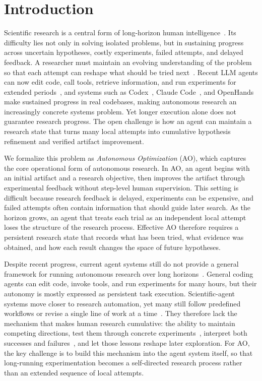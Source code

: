 \documentclass{llmxive}
\begin{document}
\section{Introduction}\label{sec:intro}

Scientific research is a central form of long-horizon human intelligence~\citep{aiscientist_long,aiscientistsurvey}. Its difficulty lies not only in solving isolated problems, but in sustaining progress across uncertain hypotheses, costly experiments, failed attempts, and delayed feedback. A researcher must maintain an evolving understanding of the problem so that each attempt can reshape what should be tried next~\citep{memorysurvey}. Recent LLM agents can now edit code, call tools, retrieve information, and run experiments for extended periods~\citep{react,toolformer,toolllm}, and systems such as Codex~\citep{codex}, Claude Code~\citep{claudecode}, and OpenHands~\citep{openhands} make sustained progress in real codebases, making autonomous research an increasingly concrete systems problem. Yet longer execution alone does not guarantee research progress. The open challenge is how an agent can maintain a research state that turns many local attempts into cumulative hypothesis refinement and verified artifact improvement.

We formalize this problem as \emph{Autonomous Optimization} (AO), which captures the core operational form of autonomous research. In AO, an agent begins with an initial artifact and a research objective, then improves the artifact through experimental feedback without step-level human supervision. This setting is difficult because research feedback is delayed, experiments can be expensive, and failed attempts often contain information that should guide later search. As the horizon grows, an agent that treats each trial as an independent local attempt loses the structure of the research process. Effective AO therefore requires a persistent research state that records what has been tried, what evidence was obtained, and how each result changes the space of future hypotheses.

Despite recent progress, current agent systems still do not provide a general framework for running autonomous research over long horizons~\citep{metaharness,autoharness}. General coding agents can edit code, invoke tools, and run experiments for many hours, but their autonomy is mostly expressed as persistent task execution. Scientific-agent systems move closer to research automation, yet many still follow predefined workflows or revise a single line of work at a time~\citep{aiscientist,agentlaboratory,aflow}. They therefore lack the mechanism that makes human research cumulative: the ability to maintain competing directions, test them through concrete experiments~\citep{treeofthoughts,lats}, interpret both successes and failures~\citep{memorysurvey}, and let those lessons reshape later exploration. For AO, the key challenge is to build this mechanism into the agent system itself, so that long-running experimentation becomes a self-directed research process rather than an extended sequence of local attempts.
\end{document}

